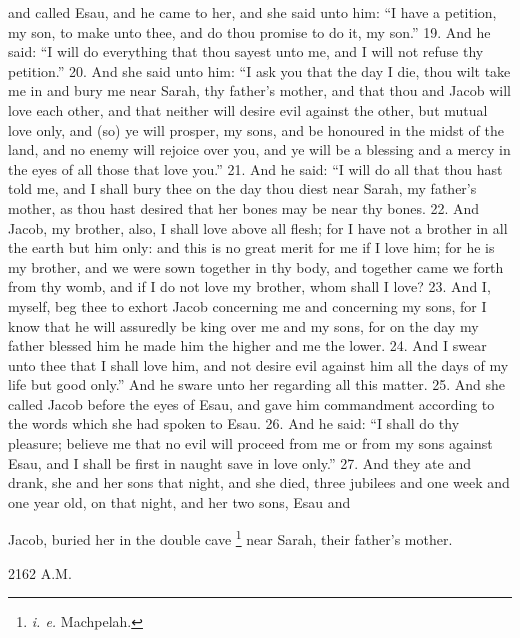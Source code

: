 and called Esau, and he came to her, and she said unto him: ``I have a petition, my son, to make unto thee, and do thou promise to do it, my son.'' 19. And he said: ``I will do everything that thou sayest unto me, and I will not refuse thy petition.'' 20. And she said unto him: ``I ask you that the day I die, thou wilt take me in and bury me near Sarah, thy father's mother, and that thou and Jacob will love each other, and that neither will desire evil against the other, but mutual love only, and (so) ye will prosper, my sons, and be honoured in the midst of the land, and no enemy will rejoice over you, and ye will be a blessing and a mercy in the eyes of all those that love you.'' 21. And he said: ``I will do all that thou hast told me, and I shall bury thee on the day thou diest near Sarah, my father's mother, as thou hast desired that her bones may be near thy bones. 22. And Jacob, my brother, also, I shall love above all flesh; for I have not a brother in all the earth but him only: and this is no great merit for me if I love him; for he is my brother, and we were sown together in thy body, and together came we forth from thy womb, and if I do not love my brother, whom shall I love? 23. And I, myself, beg thee to exhort Jacob concerning me and concerning my sons, for I know that he will assuredly be king over me and my sons, for on the day my father blessed him he made him the higher and me the lower. 24. And I swear unto thee that I shall love him, and not desire evil against him all the days of my life but good only.'' And he sware unto her regarding all this matter. 25. And she called Jacob before the eyes of Esau, and gave him commandment according to the words which she had spoken to Esau. 26. And he said: ``I shall do thy pleasure; believe me that no evil will proceed from me or from my sons against Esau, and I shall be first in naught save in love only.'' 27. And they ate and drank, she and her sons that night, and she died, three jubilees and one week and one year old, on that night, and her two sons, Esau and

Jacob, buried her in the double cave \footnote{\emph{i. e.} Machpelah.} near Sarah, their father's mother.


2162 A.M.

